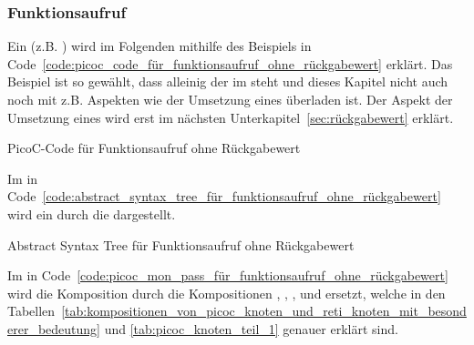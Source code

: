 \subsubsection{Funktionsaufruf}

Ein  (z.B. ) wird im Folgenden mithilfe des Beispiels in Code~\ref{code:picoc_code_für_funktionsaufruf_ohne_rückgabewert} erklärt. Das Beispiel ist so gewählt, dass alleinig der  im  steht und dieses Kapitel nicht auch noch mit z.B. Aspekten wie der Umsetzung eines  überladen ist. Der Aspekt der Umsetzung eines  wird erst im nächsten Unterkapitel~\ref{sec:rückgabewert} erklärt.


\begin{code}
  \centering
  \caption{PicoC-Code für Funktionsaufruf ohne Rückgabewert}
  \label{code:picoc_code_für_funktionsaufruf_ohne_rückgabewert}
\end{code}

Im  in Code~\ref{code:abstract_syntax_tree_für_funktionsaufruf_ohne_rückgabewert} wird ein   durch die   dargestellt.

\begin{code}
  \centering
  \caption{Abstract Syntax Tree für Funktionsaufruf ohne Rückgabewert}
  \label{code:abstract_syntax_tree_für_funktionsaufruf_ohne_rückgabewert}
\end{code}

Im  in Code~\ref{code:picoc_mon_pass_für_funktionsaufruf_ohne_rückgabewert} wird die Komposition  durch die Kompositionen , , ,  und  ersetzt, welche in den Tabellen~\ref{tab:kompositionen_von_picoc_knoten_und_reti_knoten_mit_besonderer_bedeutung} und \ref{tab:picoc_knoten_teil_1} genauer erklärt sind.

